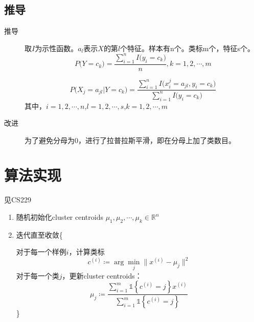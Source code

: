 \documentclass{ctexart}
\begin{document}
\subsection{推导}
\label{derivations}
\begin{description}
\item[推导]
取$I$为示性函数。$a_l$表示$X$的第$l$个特征。样本有n个。类标m个，特征s个。
\begin{equation}
P\big(Y=c_k\big)=\frac{\sum\limits_{i=1}^{n}I\big(y_i=c_k\big)}{n},k=1,2,\cdots,m
\end{equation}

\begin{equation}
P\big(X_j=a_{jl}|Y=c_k\big)=\frac{\sum\limits_{i=1}^{n}I\big(x_i^j=a_{jl},y_i=c_k\big)}{\sum\limits_{i=1}^{n}I\big(y_i=c_k\big)}
\end{equation}
其中，$i=1,2,\cdots,n$,$l=1,2,\cdots,s$,$k=1,2,\cdots,m$

\item[改进]
为了避免分母为0，进行了拉普拉斯平滑，即在分母上加了类数目。

\end{description}




\section{算法实现}
见CS229\cite{stanf:cs229}
%
\begin{enumerate}[1.]
\item 随机初始化cluster centroids $\mu_1,\mu_2,\cdots,\mu_k\in\mathbb{R}^n$
\item 迭代直至收敛\{

对于每一个样例$i$，计算类标
\begin{equation}
c^{\left(i\right)}\coloneqq \arg\min\limits_{j}\big\| x^{\left(i\right)}-\mu_{j}\big\|^2
\end{equation}
对于每一个类$j$，更新cluster centroids：
\begin{equation}
\mu_j \coloneqq \frac{\sum\limits_{i=1}^{m}\mathds{1}\left\{c^{\left(i\right)}=j\right\}x^{\left(i\right)}}{\sum\limits_{i=1}^{m}\mathds{1}\left\{c^{\left(i\right)}=j\right\}}
\end{equation}
\}
\end{enumerate}
\end{document}
